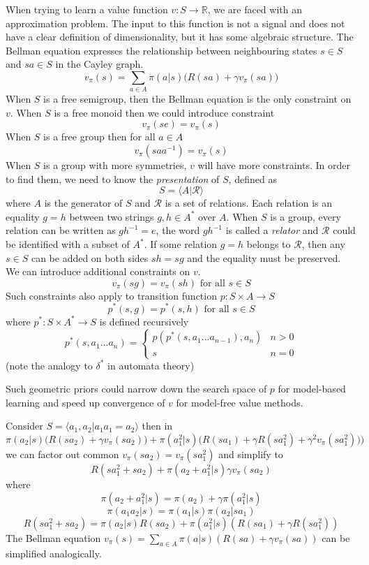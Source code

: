 \documentclass[oneside,english,logo]{amuthesis}
\begin{document}
When trying to learn a value function $v:S\rightarrow \mathbb{R}$, we are faced with an approximation problem. The input to this function is not a signal and does not have a clear definition of dimensionality, but it has some algebraic structure.  The Bellman equation expresses the relationship between neighbouring states $s\in S$ and $sa\in S$ in the Cayley graph.
\[
v_\pi(s) = \sum_{a\in A} \pi(a|s)\big(R(sa)+\gamma v_\pi(sa)\big)
\]
When $S$ is a free semigroup, then the Bellman equation is the only constraint on $v$. When $S$ is a free monoid then we could introduce constraint
\[
v_\pi(se) = v_\pi(s)
\]
When $S$ is a free group then for all $a\in A$ 
\[
v_\pi(saa^{-1}) = v_\pi(s)
\]
When $S$ is a group with more symmetries, $v$ will have more constraints. In order to find them, we need to know the \textit{presentation} of $S$, defined as
\[
S = \langle A \vert \mathcal{R} \rangle
\]
where $A$ is the generator of $S$ and $\mathcal{R}$ is a set of relations. Each relation is an equality $g=h$ between two strings $g,h\in A^*$ over $A$. When $S$ is a group, every relation can be written as $gh^{-1}=e$, the word $gh^{-1}$ is called a \textit{relator} and $\mathcal{R}$ could be identified with a subset of $A^*$.
If some relation $g=h$ belongs to $\mathcal{R}$, then any $s\in S$ can be added on both sides $sh=sg$ and the equality must be preserved.  We can introduce additional constraints on $v$.  
\[
v_\pi(sg) = v_\pi(sh) \text{ for all }s\in S 
\]
Such constraints also apply to transition function $p:S\times A \rightarrow S$ 
\[
p^*(s,g)= p^*(s,h) \text{ for all }s\in S 
\]
where $p^*:S\times A^* \rightarrow S$ is defined recursively
\begin{equation*}
p^*(s, a_1 ... a_n) = \begin{cases}
		p(p^*(s, a_1 ... a_{n-1}),a_n) & n>0\\
		s & n=0
	\end{cases}
\end{equation*}
(note the analogy to $\delta^*$ in automata theory)

Such geometric priors could narrow down the search space of $p$  for model-based learning and speed up convergence of $v$ for model-free value methods. 

\begin{example}
Consider $S=\langle a_1,a_2 | a_1a_1=a_2 \rangle$ then in
\[
\pi(a_2|s)\big(R(sa_2)+\gamma v_\pi(sa_2)\big)+\pi(a_1^2|s)\big(R(sa_1)+\gamma R(sa_1^2)+\gamma^2 v_\pi(sa_1^2))\big) 
\]
we can factor out common $v_\pi(sa_2)=v_\pi(sa_1^2)$ and simplify to
\[R(sa_1^2+sa_2) + \pi(a_2+a_1^2|s) \gamma v_\pi(sa_2) \]
where 
\[
\pi(a_2+a_1^2|s)=\pi(a_2)+\gamma \pi(a_1^2|s)
\]
\[
\pi(a_1a_2|s)=\pi(a_1|s)\pi(a_2|sa_1)
\]
\[
R(sa_1^2+sa_2)=\pi(a_2|s)R(sa_2)+\pi(a_1^2|s)(R(sa_1)+\gamma R(sa_1^2))
\]
The Bellman equation $v_\pi(s) = \sum_{a\in A} \pi(a|s)(R(sa)+\gamma v_\pi(sa))$ can be simplified analogically.
\end{example}
\end{document}

